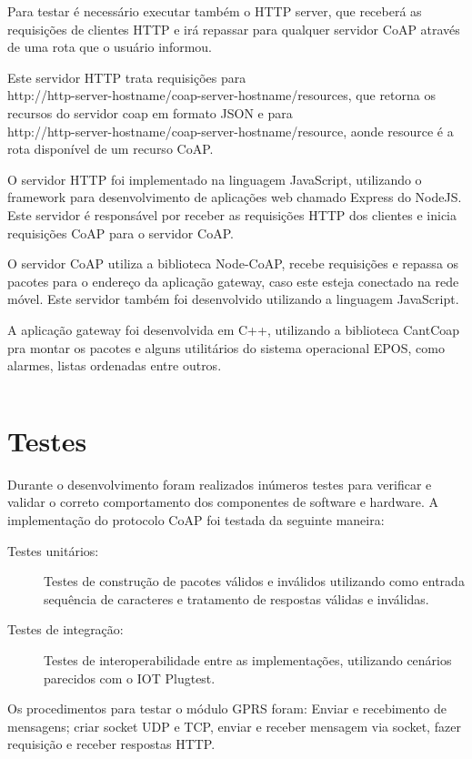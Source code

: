 Para testar \'e necess\'ario executar tamb\'em o HTTP server, que receber\'a as requisi\c{c}\~oes de clientes HTTP e ir\'a repassar para qualquer servidor CoAP atrav\'es de uma rota que o usu\'ario informou.

Este servidor HTTP trata requisi\c{c}\~oes para\\http://http-server-hostname/coap-server-hostname/resources, que retorna os recursos do servidor coap em formato JSON e para\\http://http-server-hostname/coap-server-hostname/resource, aonde resource \'e a rota dispon\'ivel de um recurso CoAP.

O servidor HTTP foi implementado na linguagem JavaScript, utilizando o framework para desenvolvimento de aplica\c{c}\~oes web chamado Express do NodeJS. Este servidor \'e respons\'avel por receber as requisi\c{c}\~oes HTTP dos clientes e inicia requisi\c{c}\~oes CoAP para o servidor CoAP.

O servidor CoAP utiliza a biblioteca Node-CoAP, recebe requisi\c{c}\~oes e repassa os pacotes para o endere\c{c}o da aplica\c{c}\~ao gateway, caso este esteja conectado na rede m\'ovel. Este servidor tamb\'em foi desenvolvido utilizando a linguagem JavaScript.

A aplica\c{c}\~ao gateway foi desenvolvida em C++, utilizando a biblioteca CantCoap pra montar os pacotes e alguns utilit\'arios do sistema operacional EPOS, como alarmes, listas ordenadas entre outros.


\begin{lstlisting}
\end{lstlisting}

\section{Testes}

Durante o desenvolvimento foram realizados in\'umeros testes para verificar e validar o correto comportamento dos componentes de software e hardware.  A implementa\c{c}\~ao do protocolo CoAP foi testada da seguinte maneira:

\begin{description}
    \item[Testes unit\'arios:] Testes de constru\c{c}\~ao de pacotes v\'alidos e inv\'alidos utilizando como entrada sequ\^encia de caracteres e tratamento de respostas v\'alidas e inv\'alidas.
    \item[Testes de integra\c{c}\~ao:] Testes de interoperabilidade entre as implementa\c{c}\~oes, utilizando cen\'arios parecidos com o IOT Plugtest.
\end{description}

Os procedimentos para testar o m\'odulo GPRS foram: Enviar e recebimento de mensagens; criar socket UDP e TCP, enviar e receber mensagem via socket, fazer requisi\c{c}\~ao e receber respostas HTTP.
